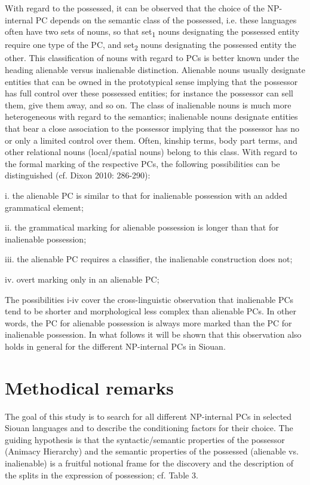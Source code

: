 \documentclass[output=paper]{LSP/langsci}
\begin{document}
With regard to the possessed, it can be observed that the choice of the NP-internal PC depends on the semantic class of the possessed, i.e. these languages often have two sets of nouns, so that set\textsubscript{1} nouns designating the possessed entity require one type of the PC, and set\textsubscript{2} nouns designating the possessed entity the other. This classification of nouns with regard to PCs is better known under the heading alienable versus inalienable distinction. Alienable nouns usually designate entities that can be owned in the prototypical sense implying that the possessor has full control over these possessed entities; for instance the possessor can sell them, give them away, and so on. The class of inalienable nouns is much more heterogeneous with regard to the semantics; inalienable nouns designate entities that bear a close association to the possessor implying that the possessor has no or only a limited control over them. Often, kinship terms, body part terms, and other relational nouns (local/spatial nouns) belong to this class. 
With regard to the formal marking of the respective PCs, the following possibilities can be distinguished (cf. Dixon 2010: 286-290):

\vspace{1em}
i.	the alienable PC is similar to that for inalienable possession with an added grammatical element;

ii.	the grammatical marking for alienable possession is longer than that for inalienable possession;

iii.	the alienable PC requires a classifier, the inalienable construction does not;

iv.	overt marking only in an alienable PC;
\vspace{1em}

The possibilities i-iv cover the cross-linguistic observation that inalienable PCs tend to be shorter and morphological less complex than alienable PCs. In other words, the PC for alienable possession is always more marked than the PC for inalienable possession. In what follows it will be shown that this observation also holds in general for the different NP-internal PCs in Siouan.

\section{Methodical remarks}

The goal of this study is to search for all different NP-internal PCs in selected Siouan languages and to describe the conditioning factors for their choice. The guiding hypothesis is that the syntactic/semantic properties of the possessor (Animacy Hierarchy) and the semantic properties of the possessed (alienable vs. inalienable) is a fruitful notional frame for the discovery and the description of the splits in the expression of possession; cf. Table 3. 
	
\end{document}
